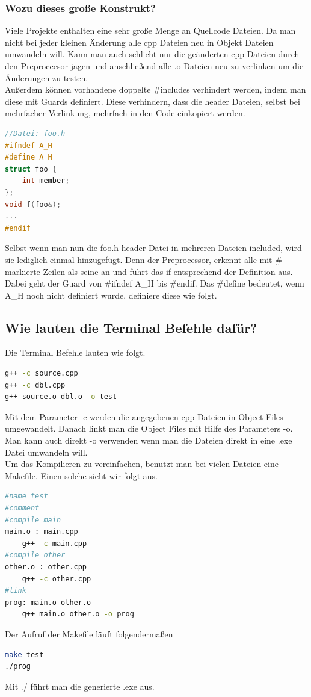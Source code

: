 \subsubsection{Wozu dieses große Konstrukt?}
Viele Projekte enthalten eine sehr große Menge an Quellcode Dateien. Da man nicht bei jeder kleinen Änderung alle cpp Dateien neu in Objekt Dateien umwandeln will. Kann man auch schlicht nur die geänderten cpp Dateien durch den Preproccesor jagen und anschließend alle .o Dateien neu zu verlinken um die Änderungen zu testen. \\
Außerdem können vorhandene doppelte \#includes verhindert werden, indem man diese mit Guards definiert. Diese verhindern, dass die header Dateien, selbst bei mehrfacher Verlinkung, mehrfach in den Code einkopiert werden. \newpage
\begin{lstlisting}[language=C++]  
//Datei: foo.h
#ifndef A_H
#define A_H
struct foo {
	int member;
};
void f(foo&);
...
#endif
\end{lstlisting}
Selbst wenn man nun die foo.h header Datei in mehreren Dateien included, wird sie lediglich einmal hinzugefügt. Denn der Preprocessor, erkennt alle mit \# markierte Zeilen als seine an und führt das if entsprechend der Definition aus. Dabei geht der Guard von \#ifndef A\_H bis \#endif. Das \#define bedeutet, wenn A\_H noch nicht definiert wurde, definiere diese wie folgt. \\
\subsection{Wie lauten die Terminal Befehle dafür?} 
Die Terminal Befehle lauten wie folgt. 
\begin{lstlisting}[language=bash]
g++ -c source.cpp 
g++ -c dbl.cpp 
g++ source.o dbl.o -o test 
\end{lstlisting}
Mit dem Parameter -c werden die angegebenen cpp Dateien in Object Files umgewandelt. Danach linkt man die Object Files mit Hilfe des Parameters -o. Man kann auch direkt -o verwenden wenn man die Dateien direkt in eine .exe Datei umwandeln will.\\
Um das Kompilieren zu vereinfachen, benutzt man bei vielen Dateien eine Makefile. Einen solche sieht wir folgt aus. 
\begin{lstlisting}[language=bash]
#name test
#comment
#compile main 
main.o : main.cpp 
	g++ -c main.cpp 
#compile other 
other.o : other.cpp 
	g++ -c other.cpp 
#link 
prog: main.o other.o 
	g++ main.o other.o -o prog 
\end{lstlisting}
Der Aufruf der Makefile läuft folgendermaßen
\begin{lstlisting}[language=bash]
make test
./prog 
\end{lstlisting}
Mit ./ führt man die generierte .exe aus. 
